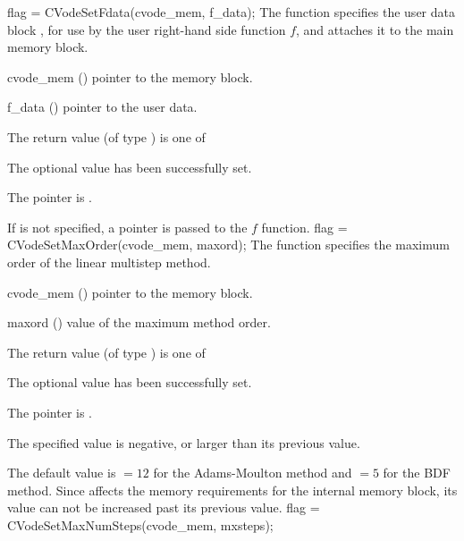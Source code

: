 {
  flag = CVodeSetFdata(cvode\_mem, f\_data);
}
{
  The function  specifies the user data block ,
  for use by the user right-hand side function $f$, and attaches it to the main 
  {\cvode} memory block.
}
{
  \begin{args}
  \item[cvode\_mem] ()
    pointer to the {\cvode} memory block.
  \item[f\_data] ()
    pointer to the user data.
  \end{args}
}
{
  The return value  (of type ) is one of
  \begin{args}
  \item[\Id{CV\_SUCCESS}] 
    The optional value has been successfully set.
  \item[\Id{CV\_MEM\_NULL}]
    The  pointer is .
  \end{args}
}
{
  If  is not specified, a  pointer is
  passed to the $f$ function.
}
{
flag = CVodeSetMaxOrder(cvode\_mem, maxord);
}
{
  The function  specifies the maximum order of the 
  linear multistep method.
}
{
  \begin{args}
  \item[cvode\_mem] ()
    pointer to the {\cvode} memory block.
  \item[maxord] ()
    value of the maximum method order.
  \end{args}
}
{
  The return value  (of type ) is one of
  \begin{args}
  \item[\Id{CV\_SUCCESS}] 
    The optional value has been successfully set.
  \item[\Id{CV\_MEM\_NULL}]
    The  pointer is .
  \item[\Id{CV\_ILL\_INPUT}]
    The specified value  is negative, or larger than 
    its previous value.
  \end{args}
}
{
  The default value is $= 12$ for
  the Adams-Moulton method and $= 5$
  for the BDF method.
  Since  affects the memory requirements
  for the internal {\cvode} memory block, its value
  can not be increased past its previous value.
}
{
flag = CVodeSetMaxNumSteps(cvode\_mem, mxsteps);
}
